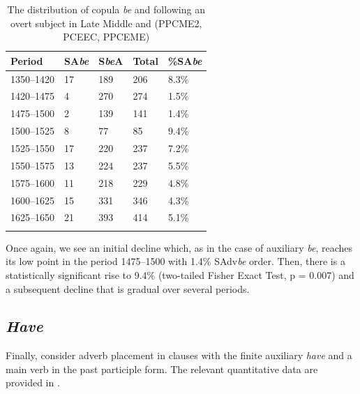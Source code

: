 \documentclass[output=paper]{langsci/langscibook}
\begin{document}
\begin{table}[htbp]
\caption{The distribution of copula \emph{be} and  following an overt
subject in Late Middle and  (PPCME2, PCEEC,
PPCEME)}\label{tab:key:09.3}
\begin{tabularx}{\textwidth}{lXXXX}
\lsptoprule
\textbf{Period} & \textbf{SA\emph{be}} & \textbf{S\emph{be}A} & \textbf{Total} & \textbf{\%SA\emph{be}}\\
\midrule
1350--1420 & 17 & 189 & 206 & 8.3\%\\
1420--1475 & 4 & 270 & 274 & 1.5\%\\
1475--1500 & 2 & 139 & 141 & 1.4\%\\
1500--1525 & 8 & 77 & 85 & 9.4\%\\
1525--1550 & 17 & 220 & 237 & 7.2\%\\
1550--1575 & 13 & 224 & 237 & 5.5\%\\
1575--1600 & 11 & 218 & 229 & 4.8\%\\
1600--1625 & 15 & 331 & 346 & 4.3\%\\
1625--1650 & 21 & 393 & 414 & 5.1\%\\
\lspbottomrule
\end{tabularx}
\end{table}

Once again, we see an initial decline which, as in the case of auxiliary
\emph{be}, reaches its low point in the period 1475--1500 with 1.4\%
SAdv\emph{be} order. Then, there is a statistically significant rise to 9.4\%
(two-tailed Fisher Exact Test, p = 0.007) and a subsequent decline that is
gradual over several periods.

\subsection{\emph{Have}}

Finally, consider adverb placement in clauses with the finite auxiliary
\emph{have} and a main verb in the past participle form. The relevant
quantitative data are provided in .
\end{document}
